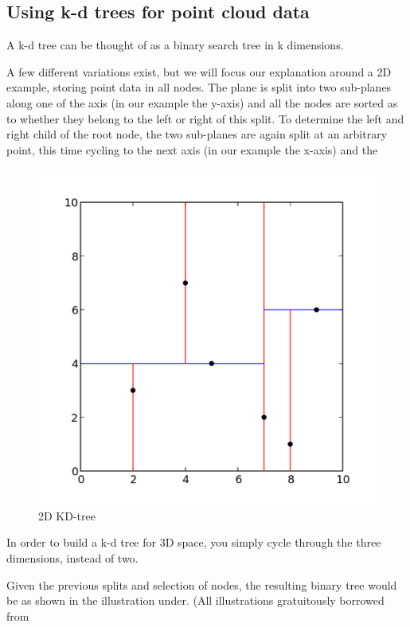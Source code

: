 \subsection{Using k-d trees for point cloud data} %
\label{ssub:using_k_d_trees_for_point_cloud_data}

A k-d tree can be thought of as a binary search tree in k dimensions.

A few different variations exist, but we will focus our explanation around a 2D example, storing point data in all nodes. The plane is split into two sub-planes along one of the axis (in our example the y-axis) and all the nodes are sorted as to whether they belong to the left or right of this split. To determine the left and right child of the root node, the two sub-planes are again split at an arbitrary point, this time cycling to the next axis (in our example the x-axis) and the

\begin{figure}[ht!]
\centering
\includegraphics[width=120mm]{../gfx/Kdtree_2d.png}

\caption{2D KD-tree}
\label{fig:kdtree_2d}
\end{figure}

In order to build a k-d tree for 3D space, you simply cycle through the three dimensions, instead of two.

Given the previous splits and selection of nodes, the resulting binary tree would be as shown in the illustration under. (All illustrations gratuitously borrowed from

